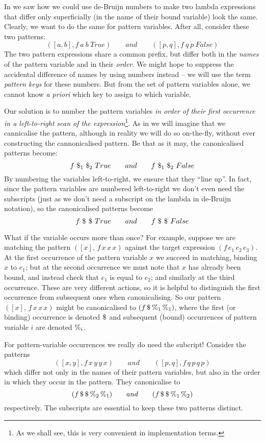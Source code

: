 \documentclass[acmsmall]{acmart}
\theoremstyle{theorem}
\theoremstyle{definition}
\theoremstyle{remark}
\begin{document}
In  we saw how we could use de-Bruijn numbers to
make two lambda expressions that differ only superficially (in the
name of their bound variable) look the same.  Clearly, we want to do
the same for pattern variables.  After all, consider these two patterns:
$$
([a,b], f~a~b~True) \qquad and \qquad ([p,q], f~q~p~False)
$$
The two pattern expressions share a common prefix, but differ both in the
\emph{names} of the pattern variable and in their \emph{order}. We might hope
to suppress the accidental difference of names by using numbers instead -- we will
use the term \emph{pattern keys} for these numbers.
But from the set of pattern variables alone, we
cannot know \emph{a priori} which key to assign to which variable.

Our solution is to number the pattern variables \emph{in order of their
first occurrence in a left-to-right scan of the expression}\footnote{As we shall
  see, this is very convenient in implementation terms.}.
As in  we will imagine that we cannicalise the pattern, although
in reality we will do so on-the-fly, without ever constructing the cannonicalised pattern.
Be that as it may, the canonicalised patterns become:
$$
   f~\$_{1}~\$_{2}~True      \qquad and \qquad  f~\$_{1}~\$_{2}~False
$$
By numbering the variables left-to-right, we ensure that they ``line up''.
In fact, since the pattern variables are numbered left-to-right we don't even
need the subscripts (just as we don't need a subscript on the lambda in
de-Bruijn notation), so the canonicalised patterns become
$$
   f~\$_{}~\$_{}~True      \qquad and \qquad  f~\$_{}~\$_{}~False
$$


What if the variable occurs more than once? For example, suppose we are matching
the pattern $([x],\, f\, x\,x\,x)$ against the target expression
$(f\,e_1\,e_2\,e_3)$.  At the first occurrence of the pattern variable $x$
we succeed in matching, binding $x$ to $e_1$; but at the second
occurrence we must note that $x$ has already been bound, and instead
check that $e_1$ is equal to $e_2$; and similarly at the third occurrence.
These are very different actions,
so it is helpful to distinguish the first occurrence from subsequent
ones when canonicalising.  So our pattern $([x],\, f\, x\,x\,x)$ might
be canonicalised to $(f\,\$_{}\,\%_{1}\,\%_{1})$, where the first (or binding) occurrence
is denoted $\$_{}$ and subsequent (bound) occurrences of pattern variable $i$ are denoted $\%_{i}$.

For pattern-variable occurrences we really do need the subcript! Consider the
patterns $$([x,y], f\,x\,y\,y\,x) \qquad and \qquad ([p,q], f\,q\,p\,q\,p)$$
which differ not only in the names of their pattern variables, but also in the
order in which they occur in the pattern.
They canonicalise to
$$(f \,\$_{}\, \$_{}\, \%_{2}\, \%_{1}) \qquad and  \qquad (f \,\$_{}\, \$_{}\, \%_{1}\, \%_{2})$$
respectively.  The subscripts are essential to keep these two patterns distinct.
\end{document}

